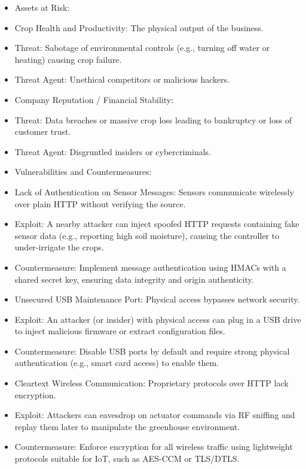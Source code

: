 \documentclass{article}
\begin{document}
\begin{itemize}
    \item[\textbf{1.}] Assets at Risk:
    \item Crop Health and Productivity: The physical output of the business.
    \item Threat: Sabotage of environmental controls (e.g., turning off water or heating) causing crop failure.
    \item Threat Agent: Unethical competitors or malicious hackers.
    \item Company Reputation / Financial Stability:
    \item Threat: Data breaches or massive crop loss leading to bankruptcy or loss of customer trust.
    \item Threat Agent: Disgruntled insiders or cybercriminals.

    \item[\textbf{2.}] Vulnerabilities and Countermeasures:
    \item Lack of Authentication on Sensor Messages: Sensors communicate wirelessly over plain HTTP without verifying the source.
    \item Exploit: A nearby attacker can inject spoofed HTTP requests containing fake sensor data (e.g., reporting high soil moisture), causing the controller to under-irrigate the crops.
    \item Countermeasure: Implement message authentication using HMACs with a shared secret key, ensuring data integrity and origin authenticity.
    \item Unsecured USB Maintenance Port: Physical access bypasses network security.
    \item Exploit: An attacker (or insider) with physical access can plug in a USB drive to inject malicious firmware or extract configuration files.
    \item Countermeasure: Disable USB ports by default and require strong physical authentication (e.g., smart card access) to enable them.
    \item Cleartext Wireless Communication: Proprietary protocols over HTTP lack encryption.
    \item Exploit: Attackers can eavesdrop on actuator commands via RF sniffing and replay them later to manipulate the greenhouse environment.
    \item Countermeasure: Enforce encryption for all wireless traffic using lightweight protocols suitable for IoT, such as AES-CCM or TLS/DTLS.
\end{itemize}
\end{document}

